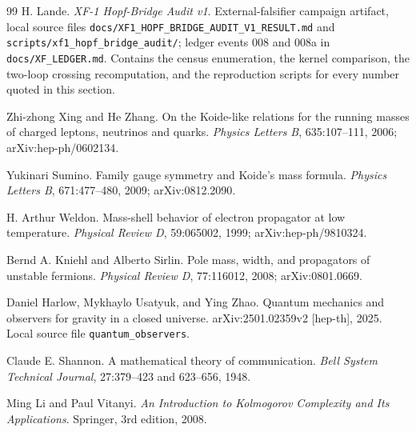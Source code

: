 \documentclass[11pt]{article}
\theoremstyle{plain}
\theoremstyle{definition}
\theoremstyle{remark}
\begin{document}
\begin{thebibliography}{99}
H. Lande.
\newblock \emph{XF-1 Hopf-Bridge Audit v1}.
\newblock External-falsifier campaign artifact, local source files \texttt{docs/XF1\_HOPF\_BRIDGE\_AUDIT\_V1\_RESULT.md} and \texttt{scripts/xf1\_hopf\_bridge\_audit/}; ledger events 008 and 008a in \texttt{docs/XF\_LEDGER.md}. Contains the census enumeration, the kernel comparison, the two-loop crossing recomputation, and the reproduction scripts for every number quoted in this section.

Zhi-zhong Xing and He Zhang.
\newblock On the Koide-like relations for the running masses of charged leptons, neutrinos and quarks.
\newblock \emph{Physics Letters B}, 635:107--111, 2006; arXiv:hep-ph/0602134.

Yukinari Sumino.
\newblock Family gauge symmetry and Koide's mass formula.
\newblock \emph{Physics Letters B}, 671:477--480, 2009; arXiv:0812.2090.

H. Arthur Weldon.
\newblock Mass-shell behavior of electron propagator at low temperature.
\newblock \emph{Physical Review D}, 59:065002, 1999; arXiv:hep-ph/9810324.

Bernd A. Kniehl and Alberto Sirlin.
\newblock Pole mass, width, and propagators of unstable fermions.
\newblock \emph{Physical Review D}, 77:116012, 2008; arXiv:0801.0669.

Daniel Harlow, Mykhaylo Usatyuk, and Ying Zhao.
\newblock Quantum mechanics and observers for gravity in a closed universe.
\newblock arXiv:2501.02359v2 [hep-th], 2025. Local source file \texttt{quantum\_observers}.

Claude E. Shannon.
\newblock A mathematical theory of communication.
\newblock \emph{Bell System Technical Journal}, 27:379--423 and 623--656, 1948.

Ming Li and Paul Vitanyi.
\newblock \emph{An Introduction to Kolmogorov Complexity and Its Applications}.
\newblock Springer, 3rd edition, 2008.

\end{thebibliography}
\end{document}
